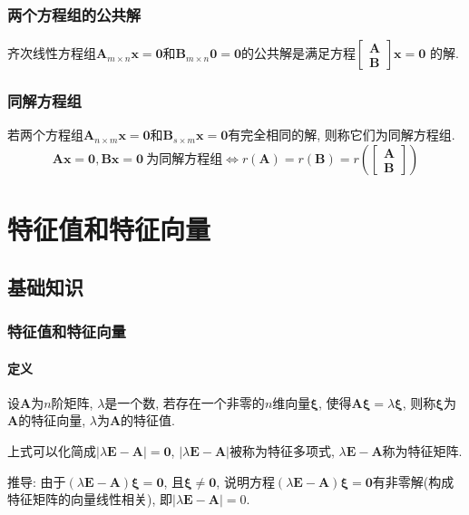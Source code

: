 \subsection{两个方程组的公共解}
齐次线性方程组$ \bm{A}_{m\times n}\bm{x}=\bm{0} $和$ \bm{B}_{m\times n}\bm{0}=\bm{0} $的公共解是满足方程$
\begin{bmatrix}
\bm{A} \\
\bm{B}
\end{bmatrix}\bm{x}=\bm{0}
$
的解.
\subsection{同解方程组}
若两个方程组$ \bm{A}_{n\times m}\bm{x}=\bm{0} $和$ \bm{B}_{s\times m}\bm{x}=\bm{0} $有完全相同的解, 则称它们为同解方程组.
\begin{equation*}
\bm{A}\bm{x}=\bm{0}, \bm{B}\bm{x}=\bm{0}\ \text{为同解方程组}\Leftrightarrow r(\bm{A})=r(\bm{B})=r\left(
\begin{bmatrix}
\bm{A} \\
\bm{B}
\end{bmatrix}
\right)
\end{equation*}
\chapter{特征值和特征向量}
\section{基础知识}
\subsection{特征值和特征向量}
\subsubsection{定义}
设$ \bm{A} $为$ n $阶矩阵, $ \lambda $是一个数, 若存在一个非零的$ n $维向量$ \bm{\xi} $, 使得$ \bm{A}\bm{\xi}=\lambda \bm{\xi} $, 则称$ \bm{\xi} $为$ \bm{A} $的特征向量, $ \lambda $为$ \bm{A} $的特征值.
\par 上式可以化简成$ \left| \lambda \bm{E}-\bm{A}\right|=\bm{0} $, $ \left| \lambda \bm{E}-\bm{A}\right| $被称为特征多项式, $ \lambda \bm{E}-\bm{A} $称为特征矩阵. \par
推导: 由于$ (\lambda \bm{E} - \bm{A}) \bm{\xi} = \bm{0} $, 且$ \bm{\xi} \neq \bm{0} $, 说明方程$ (\lambda \bm{E} - \bm{A}) \bm{\xi} = \bm{0} $有非零解(构成特征矩阵的向量线性相关), 即$ |\lambda \bm{E} - \bm{A}| = 0 $.
